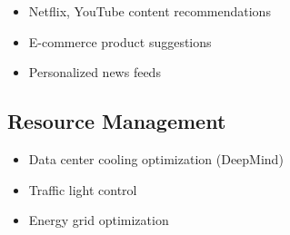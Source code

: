\begin{itemize}
    \item Netflix, YouTube content recommendations
    \item E-commerce product suggestions
    \item Personalized news feeds
\end{itemize}

\subsection{Resource Management}

\begin{itemize}
    \item Data center cooling optimization (DeepMind)
    \item Traffic light control
    \item Energy grid optimization
\end{itemize}

